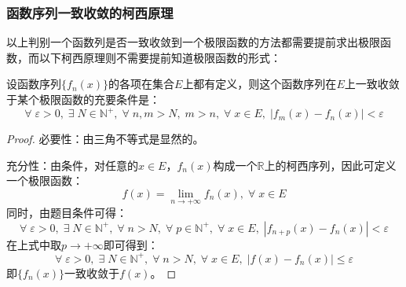 \subsubsection{函数序列一致收敛的柯西原理}
以上判别一个函数列是否一致收敛到一个极限函数的方法都需要提前求出极限函数，而以下柯西原理则不需要提前知道极限函数的形式：
\begin{theorem}
	设函数序列$\{f_n(x)\}$的各项在集合$E$上都有定义，则这个函数序列在$E$上一致收敛于某个极限函数的充要条件是：
	\begin{equation*}
		\forall\;\varepsilon>0,\;\exists\;N\in\mathbb{N}^+,\;\forall\;n,m>N,\;m>n,\;\forall\;x\in E,\;|f_m(x)-f_n(x)|<\varepsilon
	\end{equation*}
\end{theorem}
\begin{proof}
	必要性：由三角不等式是显然的。\par
	充分性：由条件，对任意的$x\in E$，$f_n(x)$构成一个$\mathbb{R}$上的柯西序列，因此可定义一个极限函数：
	\begin{equation*}
		f(x)=\lim_{n\to+\infty}f_n(x),\;\forall\;x\in E
	\end{equation*}
	同时，由题目条件可得：
	\begin{equation*}
		\forall\;\varepsilon>0,\;\exists\;N\in\mathbb{N}^+,\;\forall\;n>N,\;\forall\;p\in\mathbb{N}^+,\;\forall\;x\in E,\;|f_{n+p}(x)-f_n(x)|<\varepsilon
	\end{equation*}
	在上式中取$p\to+\infty$即可得到：
	\begin{equation*}
		\forall\;\varepsilon>0,\;\exists\;N\in\mathbb{N}^+,\;\forall\;n>N,\;\forall\;x\in E,\;|f(x)-f_n(x)|\leqslant\varepsilon
	\end{equation*}
	即$\{f_n(x)\}$一致收敛于$f(x)$。
\end{proof}